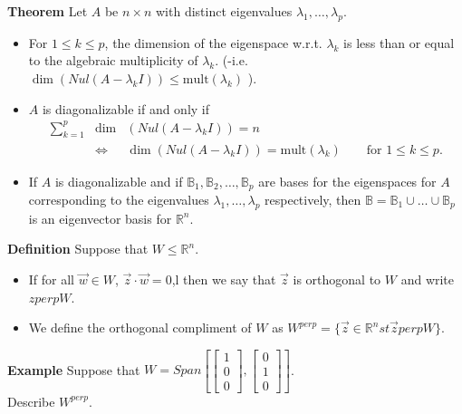  \begin{frame}[fragile]

\textbf{Theorem}
Let $A$ be $n\times n$ with distinct eigenvalues $\lambda_1,\dots,\lambda_p$.

\begin{itemize}
\item  For $1\le k\le p$, the dimension of the eigenspace w.r.t. $\lambda_k$ is less than or equal to the algebraic multiplicity of $\lambda_k$.  (-i.e. $\dim(Nul(A-\lambda_k I))\le \mbox{mult}(\lambda_k)$ ).
\item  $A$ is diagonalizable if and only if
\begin{eqnarray*}
\sum_{k=1}^p  &\dim&(Nul(A-\lambda_k I)) = n  \\
&\Leftrightarrow& \dim(Nul(A-\lambda_k I)) = \mbox{mult}(\lambda_k) \qquad \mbox{for $1\le k\le p$}.
\end{eqnarray*}
\item If $A$ is diagonalizable and if $\mathbb B_1, \mathbb B_2,\dots,\mathbb B_p$ are bases for the eigenspaces for $A$ corresponding to the eigenvalues $\lambda_1, \dots, \lambda_p$ respectively, then
$\mathbb B=\mathbb B_1\cup \dots \cup \mathbb B_p$ is an eigenvector basis for $\mathbb R^n$.
\end{itemize}

\end{frame}




 \begin{frame}[fragile]
\textbf{Definition}  Suppose that $W\le \mathbb R^n$.
\begin{itemize}
 \item  If for all $\vec{w}\in W$, $\vec{z}\cdot\vec{w}=0$,l then we say that $\vec{z}$ is orthogonal to $W$ and write $zperp W$.
 \item We define the orthogonal compliment of $W$ as $W^{perp}=\{\vec{z}\in \mathbb R^n st \vec{z}perp W\}$.
\end{itemize}
 

\textbf{Example}
Suppose that $W=Span\left[\left[\begin{array}{r}1\\0\\0\end{array}\right], \left[\begin{array}{r} 0\\1\\0\end{array}\right]  \right]$.  \\
Describe $W^{perp}$.

\end{frame}





